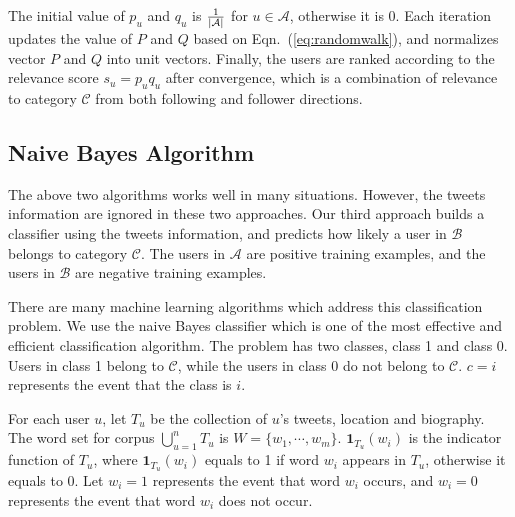 \documentclass{article}
\begin{document}
The initial value of $p_u$ and $q_u$ is ${1 \over |\mathcal{A}|}$ for $u \in \mathcal{A}$, otherwise it is 0. Each iteration updates the value of $P$ and $Q$ based on Eqn.~(\ref{eq:randomwalk}), and normalizes vector $P$ and $Q$ into unit vectors. Finally, the users are ranked according to the relevance score $s_u = p_u q_u$ after convergence, which is a combination of relevance to category $\mathcal{C}$ from both following and follower directions.

\subsection{Naive Bayes Algorithm}

The above two algorithms works well in many situations. However, the tweets information are ignored in these two approaches. Our third approach builds a classifier using the tweets information, and predicts how likely a user in $\mathcal{B}$ belongs to category $\mathcal{C}$. The users in $\mathcal{A}$ are positive training examples, and the users in $\mathcal{B}$ are negative training examples.


There are many machine learning algorithms which address this classification problem. We use the naive Bayes classifier \cite{frank2000technical} which is one of the most effective and efficient classification algorithm. The problem has two classes, class 1 and class 0. Users in class 1 belong to $\mathcal{C}$, while the users in class 0 do not belong to $\mathcal{C}$. $c = i$ represents the event that the class is $i$.

For each user $u$, let $T_u$ be the collection of $u$'s tweets, location and biography. The word set for corpus $\bigcup_{u = 1}^n T_u$ is $W = \{w_1, \cdots, w_m\}$.
$\mathbf{1}_{T_u}(w_i)$ is the indicator function of $T_u$, where $\mathbf{1}_{T_u}(w_i)$ equals to 1 if word $w_i$ appears in $T_u$, otherwise it equals to 0. Let $w_i = 1$ represents the event that word $w_i$ occurs, and $w_i = 0$ represents the event that word $w_i$ does not occur.
\end{document}
